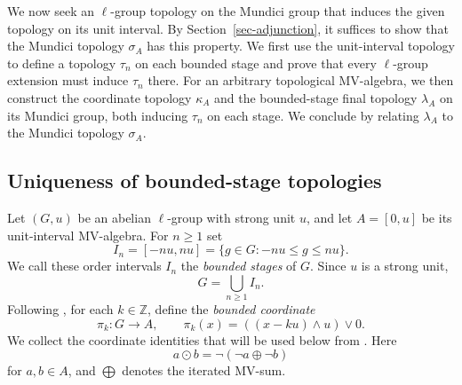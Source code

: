 \documentclass[preprint,3p]{elsarticle}
\theoremstyle{plain}
\theoremstyle{definition}
\numberwithin{equation}{section}
\begin{document}
We now seek an $\ell$-group topology on the Mundici group that induces
the given topology on its unit interval.  By Section~\ref{sec-adjunction},
it suffices to show that the Mundici topology $\sigma_A$ has this property.
We first use the unit-interval topology to define a topology
$\tau_n$ on each bounded stage and prove that every $\ell$-group
extension must induce $\tau_n$ there.
For an arbitrary topological MV-algebra, we then construct the
coordinate topology $\kappa_A$ and the bounded-stage final topology
$\lambda_A$ on its Mundici group, both inducing $\tau_n$ on each
stage.  We conclude by relating $\lambda_A$ to the Mundici
topology $\sigma_A$.

\subsection{Uniqueness of bounded-stage topologies}
\label{sec-preliminaries}

Let $(G,u)$ be an abelian $\ell$-group with strong unit $u$,
and let $A=[0,u]$ be its unit-interval MV-algebra.
For $n\geq1$ set
\[
 I_n=[-nu,nu]=\{g\in G:-nu\leq g\leq nu\}.
\]
We call these order intervals $I_n$ the \emph{bounded stages} of $G$.
Since $u$ is a strong unit,
\begin{equation}
\label{eq-bounded-stage-exhaustion}
 G=\bigcup_{n\geq1}I_n.
\end{equation}
Following \cite[Definition~2.10]{Ball2002}, for each $k\in\mathbb Z$, define the \emph{bounded coordinate}
\begin{equation}
\label{eq-pi-k}
 \pi_k\colon G\longrightarrow A,\qquad
 \pi_k(x)=((x-ku)\wedge u)\vee0.
\end{equation}
We collect the coordinate identities that will be used below from
\cite[Proposition~2.11]{Ball2002}.
Here 
\[
 a\odot b=\neg(\neg a\oplus\neg b)
\]
for $a,b\in A$, and $\bigoplus$ denotes the iterated MV-sum.
\end{document}
